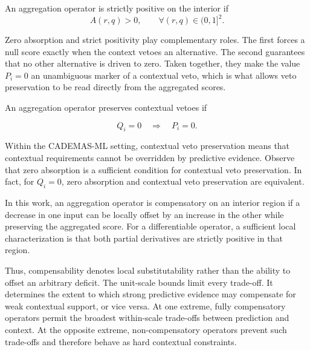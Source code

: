 \documentclass[mathematics,article,submit,moreauthors]{Definitions/mdpi}
\begin{document}
{\color{teal}
\begin{Definition}
\label{def:strict-positivity}
An aggregation operator is strictly positive on the interior if
\begin{equation}
A(r,q)>0,
\qquad \forall (r,q)\in(0,1]^2 .
\end{equation}
\end{Definition}

Zero absorption and strict positivity play complementary roles. The first
forces a null score exactly when the context vetoes an alternative. The
second guarantees that no other alternative is driven to zero. Taken
together, they make the value $P_i=0$ an unambiguous marker of a
contextual veto, which is what allows veto preservation to be read
directly from the aggregated scores.}

\begin{Definition}
An aggregation operator preserves contextual vetoes if

\begin{equation}
Q_i=0
\quad \Longrightarrow \quad
P_i=0.
\end{equation}

\end{Definition}

Within the CADEMAS-ML setting, contextual veto preservation means that
contextual requirements cannot be overridden by predictive evidence.
Observe that zero absorption is a sufficient condition for contextual
veto preservation.
{\color{red}In fact, for \(Q_i=0\), zero absorption and contextual veto preservation are equivalent.}

\begin{Definition}[Compensability]
{\color{blue}In this work, an aggregation operator is compensatory on an
interior region if a decrease in one input can be locally offset by an
increase in the other while preserving the aggregated score. For a
differentiable operator, a sufficient local characterization is that both
partial derivatives are strictly positive in that region.}
\end{Definition}

{\color{blue}Thus, compensability denotes local substitutability rather
than the ability to offset an arbitrary deficit. The unit-scale bounds
limit every trade-off. It determines the extent to which strong predictive
evidence may compensate for weak contextual support, or vice versa. At one
extreme, fully compensatory operators permit the broadest within-scale
trade-offs between prediction and context. At the opposite extreme,
non-compensatory operators prevent such trade-offs and therefore behave as
hard contextual constraints.}
\end{document}

